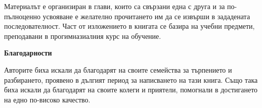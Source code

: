 Материалът е организиран в глави, които са свързани една с друга и за по-пълноценно усвояване е желателно прочитането им да се извърши в зададената последователност. Част от изложението в книгата се базира на учебни предмети, преподавани в прогимназиалния курс на обучение.

\vspace{0.5cm}

\large{\textbf{Благодарности}}

\vspace{0.5cm}

Авторите биха искали да благодарят на своите семейства за търпението и разбирането, проявено в дългият период за написването на тази книга. Също така биха искали да благодарят на своите колеги и приятели, помогнали в достигането на едно по-високо качество. 



